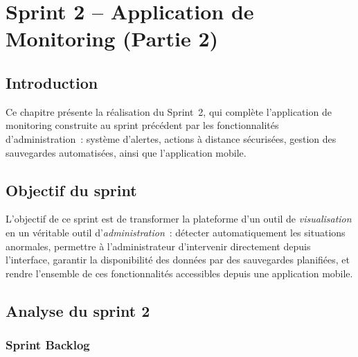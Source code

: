 \chapter{Sprint 2 -- Application de Monitoring (Partie 2)}
\label{chap-sprint2}

\section*{Introduction}

Ce chapitre présente la réalisation du Sprint~2, qui complète l'application de monitoring construite au sprint précédent par les fonctionnalités d'administration~: système d'alertes, actions à distance sécurisées, gestion des sauvegardes automatisées, ainsi que l'application mobile.

\section{Objectif du sprint}

L'objectif de ce sprint est de transformer la plateforme d'un outil de \emph{visualisation} en un véritable outil d'\emph{administration}~: détecter automatiquement les situations anormales, permettre à l'administrateur d'intervenir directement depuis l'interface, garantir la disponibilité des données par des sauvegardes planifiées, et rendre l'ensemble de ces fonctionnalités accessibles depuis une application mobile.

\section{Analyse du sprint 2}

\subsection{Sprint Backlog}

